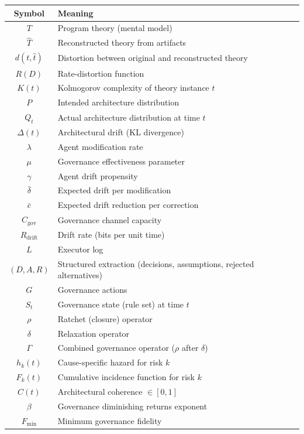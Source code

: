 \documentclass[11pt, a4paper, copyright]{googledeepmind}
\begin{document}
\begin{center}
\begin{tabular}{cl}
\toprule
Symbol & Meaning \\
\midrule
$T$ & Program theory (mental model) \\
$\hat{T}$ & Reconstructed theory from artifacts \\
$d(t, \hat{t})$ & Distortion between original and reconstructed theory \\
$R(D)$ & Rate-distortion function \\
$K(t)$ & Kolmogorov complexity of theory instance $t$ \\
$P$ & Intended architecture distribution \\
$Q_t$ & Actual architecture distribution at time $t$ \\
$\Delta(t)$ & Architectural drift (KL divergence) \\
$\lambda$ & Agent modification rate \\
$\mu$ & Governance effectiveness parameter \\
$\gamma$ & Agent drift propensity \\
$\bar{\delta}$ & Expected drift per modification \\
$\bar{c}$ & Expected drift reduction per correction \\
$C_{\mathrm{gov}}$ & Governance channel capacity \\
$R_{\mathrm{drift}}$ & Drift rate (bits per unit time) \\
$L$ & Executor log \\
$(D, A, R)$ & Structured extraction (decisions, assumptions, rejected alternatives) \\
$G$ & Governance actions \\
$S_t$ & Governance state (rule set) at time $t$ \\
$\rho$ & Ratchet (closure) operator \\
$\delta$ & Relaxation operator \\
$\Gamma$ & Combined governance operator ($\rho$ after $\delta$) \\
$h_k(t)$ & Cause-specific hazard for risk $k$ \\
$F_k(t)$ & Cumulative incidence function for risk $k$ \\
$C(t)$ & Architectural coherence $\in [0,1]$ \\
$\beta$ & Governance diminishing returns exponent \\
$F_{\min}$ & Minimum governance fidelity \\
\bottomrule
\end{tabular}
\end{center}
\end{document}
